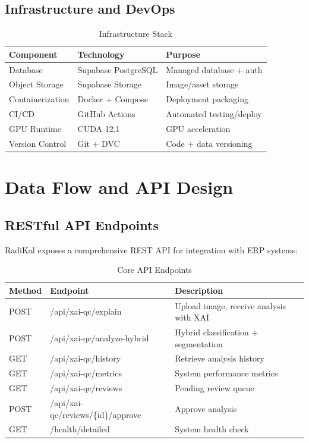 \documentclass[12pt,a4paper]{report}
\begin{document}
\subsection{Infrastructure and DevOps}

\begin{table}[H]
\centering
\caption{Infrastructure Stack}
\label{tab:infra_stack}
\begin{tabular}{lll}
\toprule
\textbf{Component} & \textbf{Technology} & \textbf{Purpose} \\
\midrule
Database & Supabase PostgreSQL & Managed database + auth \\
Object Storage & Supabase Storage & Image/asset storage \\
Containerization & Docker + Compose & Deployment packaging \\
CI/CD & GitHub Actions & Automated testing/deploy \\
GPU Runtime & CUDA 12.1 & GPU acceleration \\
Version Control & Git + DVC & Code + data versioning \\
\bottomrule
\end{tabular}
\end{table}

\section{Data Flow and API Design}

\subsection{RESTful API Endpoints}

RadiKal exposes a comprehensive REST API for integration with ERP systems:

\begin{table}[H]
\centering
\caption{Core API Endpoints}
\label{tab:api_endpoints}
\begin{tabular}{llp{7cm}}
\toprule
\textbf{Method} & \textbf{Endpoint} & \textbf{Description} \\
\midrule
POST & /api/xai-qc/explain & Upload image, receive analysis with XAI \\
POST & /api/xai-qc/analyze-hybrid & Hybrid classification + segmentation \\
GET & /api/xai-qc/history & Retrieve analysis history \\
GET & /api/xai-qc/metrics & System performance metrics \\
GET & /api/xai-qc/reviews & Pending review queue \\
POST & /api/xai-qc/reviews/\{id\}/approve & Approve analysis \\
GET & /health/detailed & System health check \\
\bottomrule
\end{tabular}
\end{table}
\end{document}

